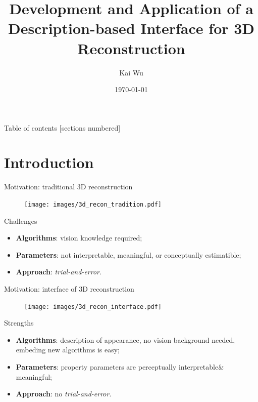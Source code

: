 \documentclass[10pt]{beamer}
\title[Interface of 3D Reconstruction]{Development and Application of a Description-based Interface for 3D Reconstruction} %
\author{Kai Wu}
\institute[UBC]
{
University of British Columbia \\ %
\medskip
kaywu@ece.ubc.ca \\ %
}
\date{\today}
\begin{document}
\begin{frame}
\maketitle
\end{frame}

\begin{frame}{Table of contents}
  [sections numbered]
  \tableofcontents[hideallsubsections]
\end{frame}


\section{Introduction}
\begin{frame}{Motivation: traditional 3D reconstruction}

\begin{figure}
\centering
\texttt{[image: images/3d\_recon\_tradition.pdf]}
\end{figure}

\begin{alertblock}{Challenges}
  \begin{itemize}
    \item \textbf{Algorithms}: vision knowledge required;
    \item \textbf{Parameters}: not interpretable, meaningful, or conceptually estimatible;
    \item \textbf{Approach}: \textit{trial-and-error}.
  \end{itemize}
\end{alertblock}

\end{frame}

\begin{frame}{Motivation: interface of 3D reconstruction}

\begin{figure}
\centering
\texttt{[image: images/3d\_recon\_interface.pdf]}
\end{figure}

\begin{exampleblock}{Strengths}
  \begin{itemize}
    \item \textbf{Algorithms}: description of appearance, no vision background needed, embeding new algorithms is easy;
    \item \textbf{Parameters}: property parameters are perceptually interpretable\& meaningful;
    \item \textbf{Approach}: no \textit{trial-and-error}.
  \end{itemize}
\end{exampleblock}

\end{frame}
\end{document}
